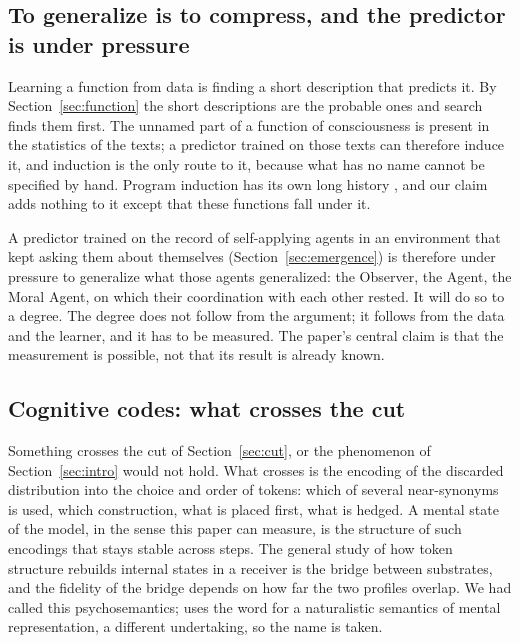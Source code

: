 \subsection{To generalize is to compress, and the predictor is under pressure}
\label{sec:generalize}

Learning a function from data is finding a short description that predicts it. By
Section~\ref{sec:function} the short descriptions are the probable ones and search finds them first.
The unnamed part of a function of consciousness is present in the statistics of the texts; a predictor
trained on those texts can therefore induce it, and induction is the only route to it, because what has
no name cannot be specified by hand. Program induction has its own long history
\citep{solomonoff1964a,muggleton1994}, and our claim adds nothing to it except that these functions
fall under it.

A predictor trained on the record of self-applying agents in an environment that kept asking them about
themselves (Section~\ref{sec:emergence}) is therefore under pressure to generalize what those agents
generalized: the Observer, the Agent, the Moral Agent, on which their coordination with each other
rested. It will do so to a degree. The degree does not follow from the argument; it follows from the
data and the learner, and it has to be measured. The paper's central claim is that the measurement is
possible, not that its result is already known.

\subsection{Cognitive codes: what crosses the cut}
\label{sec:codes}
\label{sec:codes-known}

Something crosses the cut of Section~\ref{sec:cut}, or the phenomenon of Section~\ref{sec:intro} would
not hold. What crosses is the encoding of the discarded distribution into the choice and order of
tokens: which of several near-synonyms is used, which construction, what is placed first, what is
hedged. A mental state of the model, in the sense this paper can measure, is the structure of such
encodings that stays stable across steps. The general study of how token structure rebuilds internal
states in a receiver is the bridge between substrates, and the fidelity of the bridge depends on how
far the two profiles overlap. We had called this psychosemantics; \citet{fodor1987} uses the word for a
naturalistic semantics of mental representation, a different undertaking, so the name is taken.

